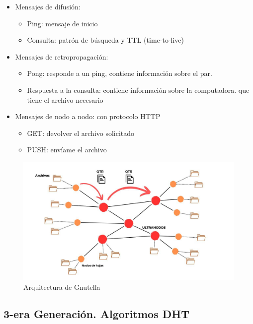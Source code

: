  \begin{itemize}
 		\item Mensajes de difusión:  		
 		\begin{itemize}
 			\item  Ping: mensaje de inicio 
 			\item Consulta: patrón de búsqueda y TTL (time-to-live)  
 		\end{itemize}
 		
 			\item Mensajes de retropropagaci\'on: 
 				\begin{itemize}
 				\item Pong: responde a un ping, contiene información sobre el par.
 				\item Respuesta a la consulta: contiene información sobre la computadora.
 				que tiene el archivo necesario
 			\end{itemize}
 			
 			
 			\item Mensajes de nodo a nodo: con protocolo HTTP 
 			\begin{itemize}
 				\item GET: devolver el archivo solicitado
 				\item PUSH: envíame el archivo
 			\end{itemize}
 \end{itemize}

 
 	 
   
  	
  	\begin{figure}%
  			\includegraphics {10/2.jpg } 
  		\caption{Arquitectura de Gnutella}
  		\label{fig:gnutella}
  	\end{figure}
 
 \subsection{3-era Generación. Algoritmos DHT}  
  

